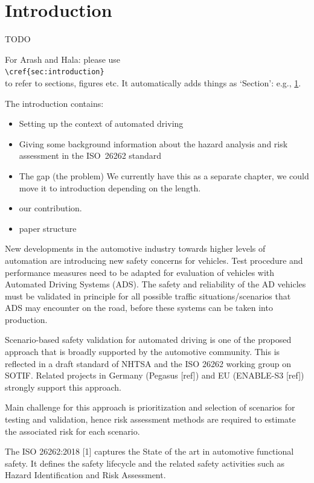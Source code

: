 \section{Introduction}
\label{sec:introduction}

TODO

\color{red}
For Arash and Hala: please use \\{\tt \textbackslash cref\{sec:introduction\}}\\ to refer to sections, figures etc. It automatically adds things as `Section': e.g., \cref{sec:introduction}.
\color{black}

The introduction contains: 
\begin{itemize}
	\item Setting up the context of automated driving
	\item Giving some background information about the hazard analysis and risk assessment in the ISO~26262 standard
	\item The gap (the problem) We currently have this as a separate chapter, we could move it to introduction depending on the length. 
	\item our contribution. 
	\item paper structure
\end{itemize}

New developments in the automotive industry towards higher levels of automation are introducing new safety concerns for vehicles. Test procedure and performance measures need to be adapted for evaluation of vehicles with Automated Driving Systems (ADS). The safety and reliability of the AD vehicles must be validated in principle for all possible traffic situations/scenarios that ADS may encounter on the road, before these systems can be taken into production.

Scenario-based safety validation for automated driving is one of the proposed approach that is broadly supported by the automotive community. This is reflected in a draft standard of NHTSA and the ISO 26262 working group on SOTIF. Related projects in Germany (Pegasus [ref]) and EU (ENABLE-S3 [ref]) strongly support this approach.

Main challenge for this approach is prioritization and selection of scenarios for testing and validation, hence risk assessment methods are required to estimate the associated risk for each scenario.

The ISO 26262:2018 [1] captures the State of the art in automotive functional safety. It defines the safety lifecycle and the related safety activities such as Hazard Identification and Risk Assessment.

